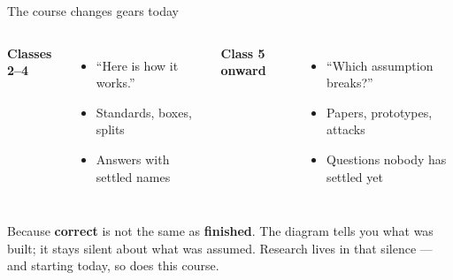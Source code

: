 \begin{frame}{The course changes gears today}
  \begin{columns}[T,onlytextwidth]
      \large\textbf{Classes 2--4}

      \vspace{0.5em}
      \normalsize
      \begin{itemize}\itemsep5pt
        \item ``Here is how it works.''
        \item Standards, boxes, splits
        \item Answers with settled names
      \end{itemize}
      \large\textbf{Class 5 onward}

      \vspace{0.5em}
      \normalsize
      \begin{itemize}\itemsep5pt
        \item ``Which assumption breaks?''
        \item Papers, prototypes, attacks
        \item Questions nobody has settled yet
      \end{itemize}
  \end{columns}

  \vspace{0.6em}
     {Because \textbf{correct} is not the same as \textbf{finished}. The diagram
      tells you what was built; it stays silent about what was assumed. Research
      lives in that silence --- and starting today, so does this course.}
\end{frame}
